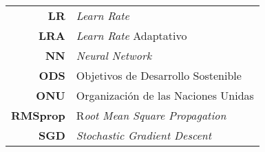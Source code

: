 \begin{table}[h]
\begin{tabular}{rl}
\textbf{LR}       & \textit{Learn Rate}                                                                    \\
\textbf{LRA}      & \textit{Learn Rate} Adaptativo                                                         \\
\textbf{NN}       & \textit{Neural Network}                                                                \\
\textbf{ODS}      & Objetivos de Desarrollo Sostenible                                            \\
\textbf{ONU}      & Organización de las Naciones Unidas                                           \\
\textbf{RMSprop}  & R\textit{oot Mean Square Propagation}                                                  \\
\textbf{SGD}      & \textit{Stochastic Gradient Descent}                                                  
\end{tabular}
\end{table}
